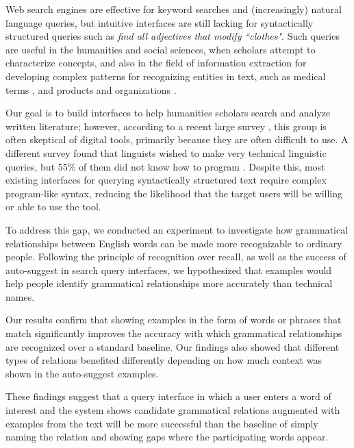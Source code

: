 Web search engines are effective for keyword searches and (increasingly) natural language queries, but intuitive interfaces are still lacking for  syntactically structured queries such as \emph{ find all adjectives that modify ``clothes"}. Such queries are useful in the humanities and social sciences, when scholars attempt to characterize concepts, and also in the field of information extraction for developing complex patterns for recognizing entities in text, such as medical terms \cite{hirschman2005overview,maclean2013identifying}, and  products and organizations \cite{culotta2005reducing}.

Our goal is to build interfaces to help humanities scholars search and analyze written literature; however, according to a recent large survey \cite{gibbs_building_2012}, this group is often skeptical of digital tools, primarily because they are often difficult to use.  A different survey found that  linguists wished to make very technical  linguistic queries, but 55\% of them did not know how to program \cite{soehn2008requirements}. Despite this, most existing interfaces for  querying syntactically structured text require complex program-like syntax, reducing the likelihood that the target users will be willing or able to use the tool.

To address this gap, we conducted an experiment to investigate how grammatical relationships between English words can be made more recognizable to ordinary people. Following the principle of recognition over recall, as well as the success of auto-suggest in search query interfaces, we hypothesized that examples would help people identify grammatical relationships more accurately than technical names.

Our results confirm that showing examples in the form of words or phrases that match significantly improves the accuracy with which grammatical relationships are recognized over a standard baseline.  Our findings also showed that different types of relations benefited differently depending on how much context was shown in the auto-suggest examples.

These findings suggest that a query interface in which a user enters a word of interest and the system shows candidate grammatical relations augmented with examples from the text will be more successful than the baseline of simply naming the relation and showing gaps where the participating words appear.



